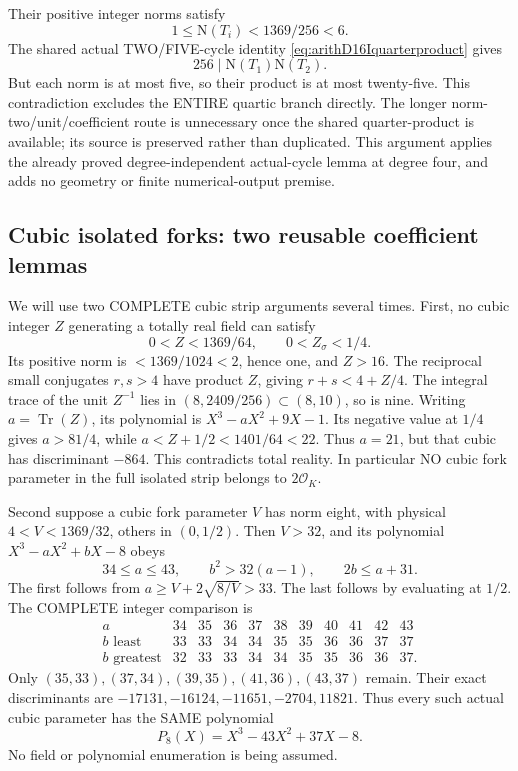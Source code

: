 Their positive integer norms satisfy
\[
                          1\le\mathrm N(T_i)<1369/256<6 .
\]
The shared actual TWO/FIVE-cycle identity
\eqref{eq:arithD16Iquarterproduct} gives
\[
                           256\mid\mathrm N(T_1)\mathrm N(T_2).
\]
But each norm is at most five, so
their product is at most twenty-five.
This contradiction excludes the ENTIRE
quartic branch directly.
The longer norm-two/unit/coefficient
route is unnecessary once the shared
quarter-product is available; its source
is preserved rather than duplicated.
This argument applies the already proved
degree-independent actual-cycle lemma
at degree four, and adds no geometry
or finite numerical-output premise.

\subsection{Cubic isolated forks: two reusable coefficient lemmas}
\label{app:arithD16Icubiclemmas}

We will use two COMPLETE cubic strip
arguments several times.
First, no cubic integer \(Z\) generating
a totally real field can satisfy
\[
                   0<Z<1369/64,\qquad0<Z_\sigma<1/4 .
\]
Its positive norm is \(<1369/1024<2\),
hence one, and \(Z>16\).
The reciprocal small conjugates \(r,s>4\)
have product \(Z\), giving
\(r+s<4+Z/4\).
The integral trace of the unit \(Z^{-1}\)
lies in \((8,2409/256)\subset(8,10)\),
so is nine.
Writing \(a=\operatorname{Tr}(Z)\),
its polynomial is \(X^3-aX^2+9X-1\).
Its negative value at \(1/4\) gives
\(a>81/4\), while
\(a<Z+1/2<1401/64<22\).
Thus \(a=21\), but that cubic has
discriminant \(-864\).
This contradicts total reality.
In particular NO cubic fork parameter
in the full isolated strip belongs
to \(2\mathcal O_K\).

Second suppose a cubic fork parameter
\(V\) has norm eight, with physical
\(4<V<1369/32\), others in \((0,1/2)\).
Then \(V>32\), and its polynomial
\(X^3-aX^2+bX-8\) obeys
\[
                   34\le a\le43,\qquad
                   b^2>32(a-1),\qquad2b\le a+31 .
\]
The first follows from
\(a\ge V+2\sqrt{8/V}>33\).
The last follows by evaluating at
\(1/2\).
The COMPLETE integer comparison is
\[
\begin{array}{c|rrrrrrrrrr}
a&34&35&36&37&38&39&40&41&42&43\\ \hline
b\text{ least}&33&33&34&34&35&35&36&36&37&37\\
b\text{ greatest}&32&33&33&34&34&35&35&36&36&37 .
\end{array}
\]
Only \((35,33),(37,34),(39,35),
(41,36),(43,37)\) remain.
Their exact discriminants are
\(-17131,-16124,-11651,-2704,11821\).
Thus every such actual cubic parameter
has the SAME polynomial
\[
                               P_8(X)=X^3-43X^2+37X-8 .
\tag{D16IP8}\label{eq:arithD16Icubicnormeight}
\]
No field or polynomial enumeration
is being assumed.

